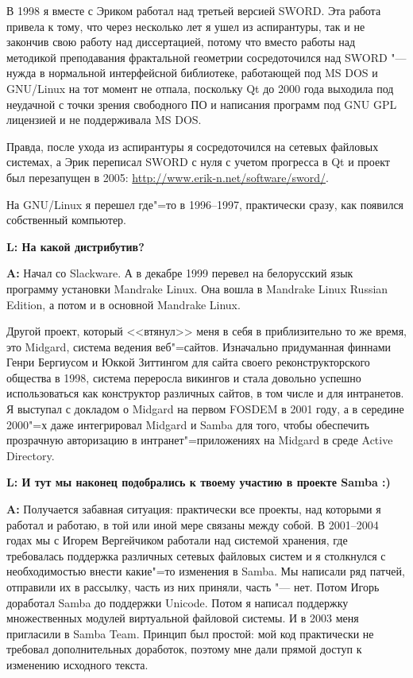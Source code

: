 \documentclass[10pt, a5paper]{article}
\begin{document}
В 1998 я вместе с Эриком работал над третьей версией SWORD. Эта работа привела
к тому, что через несколько лет я ушел из аспирантуры, так и не закончив свою
работу над диссертацией, потому что вместо работы над методикой преподавания
фрактальной геометрии сосредоточился над SWORD "--- нужда в нормальной
интерфейсной библиотеке, работающей под MS DOS и GNU/Linux на тот момент не отпала,
поскольку Qt до 2000 года выходила под неудачной с точки зрения свободного ПО и написания
программ под GNU GPL лицензией и не поддерживала MS DOS.

Правда, после ухода из аспирантуры я сосредоточился на сетевых файловых системах,
а Эрик переписал SWORD с нуля с учетом прогресса в Qt и проект был перезапущен в 2005: 
\url{http://www.erik-n.net/software/sword/}. 

На GNU/Linux я перешел где"=то в 1996--1997, практически сразу, как появился
собственный компьютер.

{\noindent \bf L: На какой дистрибутив?}

{\noindent \bf A:} Начал со Slackware. А в декабре 1999 перевел на белорусский
язык программу установки Mandrake Linux. Она вошла в Mandrake Linux Russian
Edition, а потом и в основной Mandrake Linux.

Другой проект, который <<втянул>> меня в себя в приблизительно то же время, это
Midgard, система ведения веб"=сайтов. Изначально придуманная финнами Генри
Бергиусом и Юккой Зиттингом для сайта своего реконструкторского общества в
1998, система переросла викингов и стала довольно успешно использоваться как
конструктор различных сайтов, в том числе и для интранетов. Я выступал с докладом
о Midgard на первом FOSDEM в 2001 году, а в середине 2000"=х даже интегрировал
Midgard и Samba для того, чтобы обеспечить прозрачную авторизацию в
интранет"=приложениях на Midgard в среде Active Directory.

{\noindent \bf L: И тут мы наконец подобрались к твоему участию в проекте Samba :) }

{\noindent \bf A:} Получается забавная ситуация: практически все проекты, над которыми я работал и
работаю, в той или иной мере связаны между собой. В 2001--2004 годах мы с Игорем
Вергейчиком работали над системой хранения, где требовалась поддержка различных
сетевых файловых систем и я столкнулся с необходимостью внести какие"=то
изменения в Samba.  Мы написали ряд патчей, отправили их в рассылку, часть из
них приняли, часть "--- нет.  Потом Игорь доработал Samba до поддержки Unicode.
Потом я написал поддержку множественных модулей виртуальной файловой системы. И в
2003 меня пригласили в Samba Team. Принцип был простой: мой код практически
не требовал дополнительных доработок, поэтому мне дали прямой доступ к
изменению исходного текста.
\end{document}
